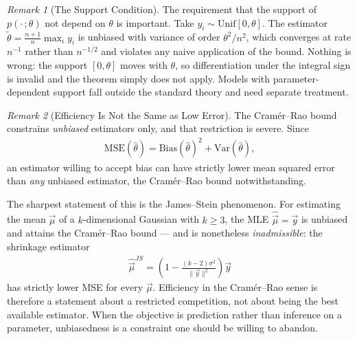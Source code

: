 \documentclass[11pt]{article}
\theoremstyle{definition}
\theoremstyle{plain}
\theoremstyle{remark}
\newtheorem{remark}{Remark}[section]
\begin{document}
\begin{remark}[The Support Condition]
    The requirement that the support of $p(\cdot\,;\theta)$ not depend on $\theta$ is important. Take $y_i \sim \mathrm{Unif}[0,\theta]$. The estimator $\tilde{\theta} = \frac{n+1}{n}\max_i y_i$ is unbiased with variance of order $\theta^2/n^2$, which converges at rate $n^{-1}$ rather than $n^{-1/2}$ and violates any naive application of the bound. Nothing is wrong: the support $[0,\theta]$ moves with $\theta$, so differentiation under the integral sign is invalid and the theorem simply does not apply. Models with parameter-dependent support fall outside the standard theory and need separate treatment.
\end{remark}

\begin{remark}[Efficiency Is Not the Same as Low Error]
    The Cramér--Rao bound constrains \emph{unbiased} estimators only, and that restriction is severe. Since
    \begin{align}
        \mathrm{MSE}(\hat{\theta}) = \mathrm{Bias}(\hat{\theta})^2 + \mathrm{Var}(\hat{\theta}),
    \end{align}
    an estimator willing to accept bias can have strictly lower mean squared error than \emph{any} unbiased estimator, the Cramér--Rao bound notwithstanding.

    The sharpest statement of this is the James--Stein phenomenon. For estimating the mean $\vec{\mu}$ of a $k$-dimensional Gaussian with $k \geq 3$, the MLE $\hat{\vec{\mu}} = \vec{y}$ is unbiased and attains the Cramér--Rao bound --- and is nonetheless \emph{inadmissible}: the shrinkage estimator
    \begin{align}
        \hat{\vec{\mu}}^{JS} = \left(1 - \frac{(k-2)\sigma^2}{\|\vec{y}\|^2}\right)\vec{y}
    \end{align}
    has strictly lower MSE for every $\vec{\mu}$. Efficiency in the Cramér--Rao sense is therefore a statement about a restricted competition, not about being the best available estimator. When the objective is prediction rather than inference on a parameter, unbiasedness is a constraint one should be willing to abandon.
\end{remark}
\end{document}
